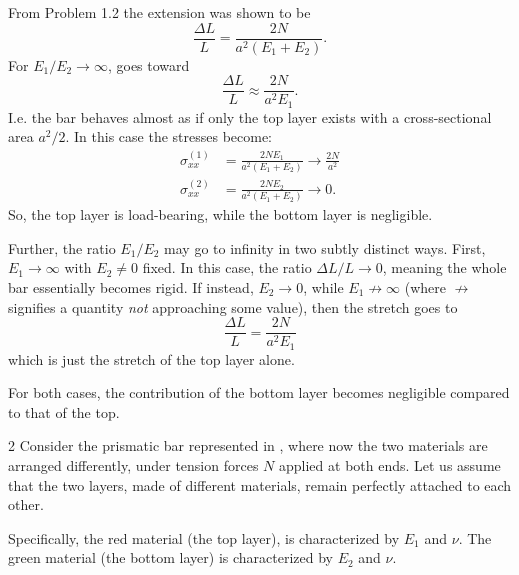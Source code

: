   \begin{derivation}
    From Problem 1.2 the extension was shown to be
    \begin{equation} \label{eq:31ex}
      \frac{\Delta L}{L} = \frac{2N}{a^2 \left( E_1 + E_2 \right)}
    .\end{equation}
    For $E_1 / E_2 \to \infty$,  goes toward
    \begin{equation*}
      \frac{\Delta L}{L} \approx \frac{2N}{a^2 E_1}
    .\end{equation*}
    I.e. the bar behaves almost as if only the top layer exists with a cross-sectional area $a^2 / 2$.
    In this case the stresses become:
    \begin{align*}
      \sigma_{x x}^{(1)} &= \frac{2 N E_1}{a^2 \left( E_1 + E_2 \right)} \to \frac{2N}{a^2} \\
      \sigma_{x x}^{(2)} &= \frac{2N E_2}{a^2 \left( E_1 + E_2 \right)} \to 0
    .\end{align*}
    So, the top layer is load-bearing, while the bottom layer is negligible.

    Further, the ratio $E_1 / E_2$ may go to infinity in two subtly distinct ways.
    First, $E_1 \to \infty$ with $E_2 \neq 0$ fixed.
    In this case, the ratio $\Delta L / L \to 0$, meaning the whole bar essentially becomes rigid.
    If instead, $E_2 \to 0$, while $E_1 \not\to \infty$ (where $\not\to$ signifies a quantity \textit{not} approaching some value), then the stretch goes to
    \begin{equation*}
      \frac{\Delta L}{L} = \frac{2N}{a^2 E_1}
    \end{equation*}
    which is just the stretch of the top layer alone.

    For both cases, the contribution of the bottom layer becomes negligible compared to that of the top.
  \end{derivation}


  \begin{probdef}{2}
    Consider the prismatic bar represented in , where now the two materials are arranged differently, under tension forces $N$ applied at both ends.
    Let us assume that the two layers, made of different materials, remain perfectly attached to each other.

    Specifically, the red material (the top layer), is characterized by $E_1$ and $\nu$.
    The green material (the bottom layer) is characterized by $E_2$ and $\nu$.
  \end{probdef}

